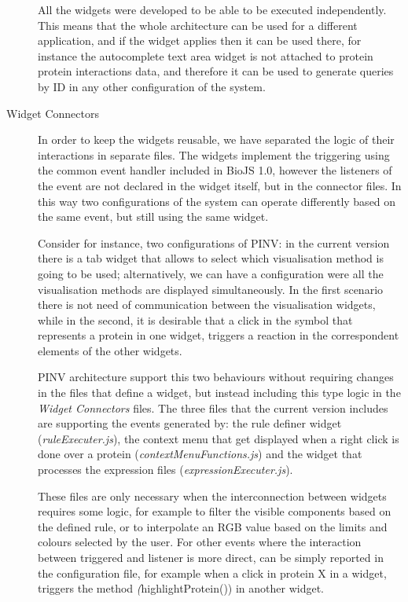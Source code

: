 \begin{description}
All the widgets were developed to be able to be executed independently. This means that the whole architecture can be used for a different application, and if the widget applies then it can be used there, for instance the autocomplete text area widget is not attached to protein protein interactions data, and therefore it can be used to generate queries by ID in any other configuration of the system.

\item[Widget Connectors]
In order to keep the widgets reusable, we have separated the logic of their interactions in separate files. The widgets implement the triggering using the common event handler included in BioJS 1.0, however the listeners of the event are not declared in the widget itself, but in the connector files. In this way two  configurations of the system can operate differently based on the same event, but still using the same widget. 

Consider for instance, two configurations of PINV: in the current version there is a tab widget that allows to select which visualisation method is going to be used; alternatively, we can have a configuration were all the visualisation methods are displayed simultaneously. In the first scenario there is not need of communication between the visualisation widgets, while in the second, it is desirable that a click in the symbol that represents a protein in one widget, triggers a reaction in the correspondent elements of the other widgets. 

PINV architecture support this two behaviours without requiring changes in the files that define a widget, but instead including this type logic in the \emph{Widget Connectors} files. The three files that the current version includes are supporting the events generated by: the rule definer widget (\emph{ruleExecuter.js}), the context menu that get displayed when a right click is done over a protein (\emph{contextMenuFunctions.js}) and the widget that processes the expression files  (\emph{expressionExecuter.js}).

These files are only necessary when the interconnection between widgets requires some logic, for example to filter the visible components based on the defined rule, or to interpolate an RGB value based on the limits and colours selected by the user. For other events where the interaction between triggered and listener is more direct, can be simply reported in the configuration file, for example when a click in protein X in a widget, triggers the method \emph(highlightProtein()) in another widget.


\end{description}
